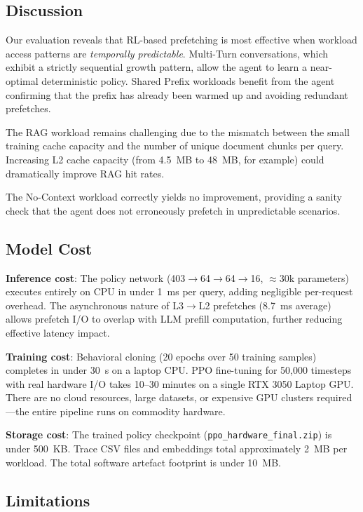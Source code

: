 \documentclass[conference]{IEEEtran}
\begin{document}
\subsection{Discussion}

Our evaluation reveals that RL-based prefetching is most effective when workload access patterns are \emph{temporally predictable}. Multi-Turn conversations, which exhibit a strictly sequential growth pattern, allow the agent to learn a near-optimal deterministic policy. Shared Prefix workloads benefit from the agent confirming that the prefix has already been warmed up and avoiding redundant prefetches.

The RAG workload remains challenging due to the mismatch between the small training cache capacity and the number of unique document chunks per query. Increasing L2 cache capacity (from 4.5~MB to 48~MB, for example) could dramatically improve RAG hit rates.

The No-Context workload correctly yields no improvement, providing a sanity check that the agent does not erroneously prefetch in unpredictable scenarios.

\subsection{Model Cost}

\textbf{Inference cost}: The policy network (403$\rightarrow$64$\rightarrow$64$\rightarrow$16, $\approx$30k parameters) executes entirely on CPU in under 1~ms per query, adding negligible per-request overhead. The asynchronous nature of L3$\rightarrow$L2 prefetches (8.7~ms average) allows prefetch I/O to overlap with LLM prefill computation, further reducing effective latency impact.

\textbf{Training cost}: Behavioral cloning (20 epochs over 50 training samples) completes in under 30~s on a laptop CPU. PPO fine-tuning for 50,000 timesteps with real hardware I/O takes 10--30 minutes on a single RTX 3050 Laptop GPU. There are no cloud resources, large datasets, or expensive GPU clusters required---the entire pipeline runs on commodity hardware.

\textbf{Storage cost}: The trained policy checkpoint (\texttt{ppo\_hardware\_final.zip}) is under 500~KB. Trace CSV files and embeddings total approximately 2~MB per workload. The total software artefact footprint is under 10~MB.

\subsection{Limitations}
\end{document}
